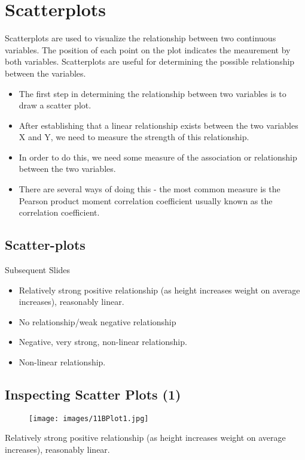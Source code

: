 \documentclass[]{report}
\begin{document}
\section{Scatterplots}
Scatterplots are used to visualize the relationship between two continuous variables. The position of each point on the plot indicates the meaurement by both variables. Scatterplots are useful for determining the possible relationship between the variables.

\begin{itemize}
	\item The first step in determining the relationship between two
	variables is to draw a scatter plot.
	\item After establishing that a linear relationship exists between the
	two variables X and Y, we need to measure the strength of this
	relationship.
	\item In order to do this, we need some measure of the association
	or relationship between the two variables.
	\item There are several ways of doing this - the most common
	measure is the Pearson product moment correlation
	coefficient usually known as the correlation coefficient.
	
\end{itemize}



%


\subsection{Scatter-plots}
Subsequent Slides
\begin{itemize}
	\item Relatively strong positive relationship (as height increases
	weight on average increases), reasonably linear.
	\item No relationship/weak negative relationship
	\item Negative, very strong, non-linear relationship.
	\item Non-linear relationship.
\end{itemize}


\subsection*{Inspecting Scatter Plots (1) }
\begin{figure}[h!]
	\texttt{[image: images/11BPlot1.jpg]}\\
\end{figure}
Relatively strong positive relationship (as height increases
weight on average increases), reasonably linear.
\end{document}

